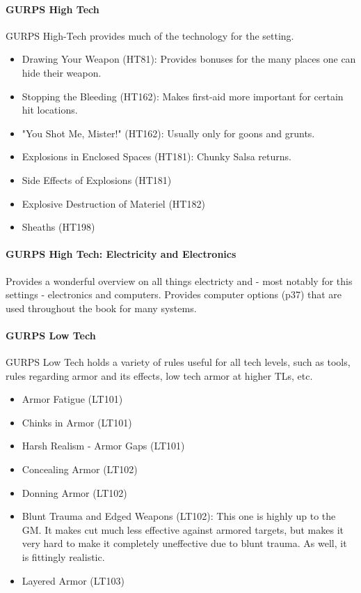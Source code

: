 \begin{multicols*}{3}
	\paragraph{GURPS High Tech}
	GURPS High-Tech provides much of the technology for the setting.
	\begin{itemize}
		\itemsep0em 
		\item Drawing Your Weapon (HT81): Provides bonuses for the many places one can hide their weapon.
		\item Stopping the Bleeding (HT162): Makes first-aid more important for certain hit locations.
		\item "You Shot Me, Mister!" (HT162): Usually only for goons and grunts.
		\item Explosions in Enclosed Spaces (HT181): Chunky Salsa returns.
		\item Side Effects of Explosions (HT181)
		\item Explosive Destruction of Materiel (HT182)
		\item Sheaths (HT198)
	\end{itemize}

	\paragraph{GURPS High Tech: Electricity and Electronics}
	Provides a wonderful overview on all things electricty and - most notably for this settings - electronics and computers. Provides computer options (p37) that are used throughout the book for many systems.
	
	\paragraph{GURPS Low Tech}
	GURPS Low Tech holds a variety of rules useful for all tech levels, such as tools, rules regarding armor and its effects, low tech armor at higher TLs, etc.
	
	\begin{itemize}
		\itemsep0em 
		\item Armor Fatigue (LT101)
		\item Chinks in Armor (LT101)
		\item Harsh Realism - Armor Gaps (LT101)
		\item Concealing Armor (LT102)
		\item Donning Armor (LT102)
		\item Blunt Trauma and Edged Weapons (LT102): This one is highly up to the GM. It makes cut much less effective against armored targets, but makes it very hard to make it completely uneffective due to blunt trauma. As well, it is fittingly realistic.
		\item Layered Armor (LT103)
	\end{itemize}
	

\end{multicols*}
